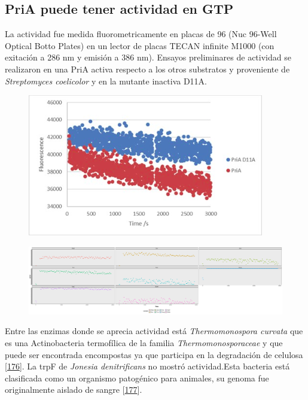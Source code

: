 \documentclass[12pt,twoside]{reedthesis}
\begin{document}
{  \subsection{PriA puede tener actividad en
  GTP}\label{pria-puede-tener-actividad-en-gtp}
  
  La actividad fue medida fluorometricamente en placas de 96 (Nuc 96-Well
  Optical Botto Plates) en un lector de placas TECAN infinite M1000 (con
  exitación a 286 nm y emisión a 386 nm). Ensayos preliminares de
  actividad se realizaron en una PriA activa respecto a los otros
  substratos y proveniente de \emph{Streptomyces coelicolor} y en la
  mutante inactiva D11A.
  
  \begin{figure}[h!tbp]
  \centering
  \includegraphics[angle = 0,scale = 0.8]{chapter4/MutantControl.png}
  \caption[Scoe and non functional Scoe PriA acting on dGTP]{\footnotesize{}}
  \label{fig:PriARutas1}
  \end{figure}
  
  \begin{figure}[h!tbp]
  \centering
  \includegraphics[angle = 0,scale = 0.6]{chapter4/GTPCinetica.pdf}
  \caption[Scoe and non functional Scoe PriA acting on dGTP]{\footnotesize{}}
  \label{fig:PriARutas2}
  \end{figure}
  
  \clearpage  
  
  Entre las enzimas donde se aprecia actividad está \emph{Thermomonospora
  curvata} que es una Actinobacteria termofílica de la familia
  \emph{Thermomonosporaceae} y que puede ser encontrada encompostas ya que
  participa en la degradación de celulosa
  {[}\protect\hyperlink{ref-chertkov_complete_2011}{176}{]}. La trpF de
  \emph{Jonesia denitrificans} no mostró actividad.Esta bacteria está
  clasificada como un organismo patogénico para animales, su genoma fue
  originalmente aislado de sangre
  {[}\protect\hyperlink{ref-pukall_complete_2009}{177}{]}.
  
}
\end{document}
